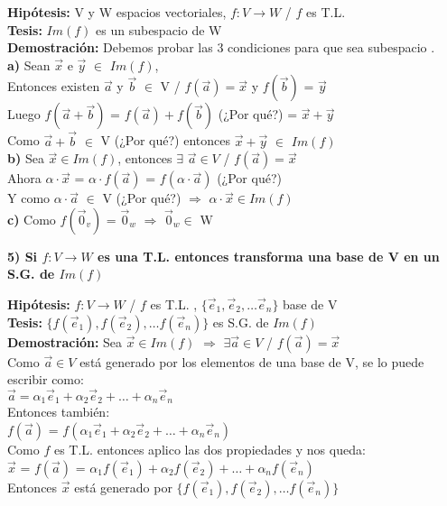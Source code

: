 \documentclass[11pt]{article}
\begin{document}
\vspace{2mm} \noindent
{\bfseries Hipótesis:} V y W espacios vectoriales, $f: V \rightarrow W$ / $f$ es T.L. \\
{\bfseries Tesis:} $Im(f)$ es un subespacio de W \\
{\bfseries Demostración:} Debemos probar las 3 condiciones para que sea
subespacio .\\
{\bfseries{a)}} Sean $\vec{x}$ e $\vec{y}$ $\in$ $Im(f)$, \\
Entonces existen $\vec{a}$ y $\vec{b}$ $\in$ V / $f(\vec{a}) = \vec{x}$ y $f(\vec{b})$ = $\vec{y}$ \\
Luego $f(\vec{a} + \vec{b})$ = $f(\vec{a}) + f(\vec{b})$ (¿Por qué?) = $\vec{x} + \vec{y}$\\
Como $\vec{a} + \vec{b}$ $\in$ V (¿Por qué?) entonces $\vec{x} + \vec{y}$ $\in $ $Im(f)$\\
{\bfseries{b)}} Sea $\vec{x} \in Im(f)$, entonces $\exists$ $\vec{a} \in V$ / $f(\vec{a}) = \vec{x}$ \\
Ahora $\alpha \cdot \vec{x}$ = $\alpha \cdot f(\vec{a})$ = $f(\alpha \cdot \vec{a})$ (¿Por qué?)\\
Y como $\alpha \cdot \vec{a}$ $\in$ V (¿Por qué?) $\Rightarrow$ $\alpha \cdot \vec{x} \in Im(f)$ \\
{\bfseries{c)}} Como $f(\vec{0}_v)$ = $\vec{0}_w$ $\Rightarrow$ $\vec{0}_w \in$ W

\vspace{2mm} \noindent
{\Large \bfseries{5) Si $f: V \rightarrow W$ es una T.L. entonces transforma una base de V en un S.G. de $Im(f)$}}

\vspace{2mm} \noindent
{\bfseries Hipótesis:} $f: V \rightarrow W$ / $f$ es T.L. , $\{\vec{e}_1, \vec{e}_2, \hdots  \vec{e}_n\}$ base de V \\
{\bfseries Tesis:} $\{f(\vec{e}_1), f(\vec{e}_2), \hdots  f(\vec{e}_n)\}$ es S.G. de $Im(f)$ \\
{\bfseries Demostración:} Sea $\vec{x} \in Im(f)$ $\Rightarrow$ $\exists \vec{a} \in V$ / $f(\vec{a}) = \vec{x}$ \\
Como $\vec{a} \in V$ está generado por los elementos de una base de V, se lo puede escribir como: \\
$\vec{a} = \alpha_1\vec{e}_1 + \alpha_2\vec{e}_2 + \hdots + \alpha_n\vec{e}_n$
\\Entonces también: \\
$f(\vec{a})$ = $f(\alpha_1\vec{e}_1 + \alpha_2\vec{e}_2 + \hdots + \alpha_n\vec{e}_n)$\\
Como $f$ es T.L. entonces aplico las dos propiedades y nos queda: \\
$\vec{x}$ = $f(\vec{a})$ = $\alpha_1f(\vec{e}_1) + \alpha_2f(\vec{e}_2) + \hdots + \alpha_nf(\vec{e}_n)$ \\
Entonces $\vec{x}$ está generado por $\{f(\vec{e}_1), f(\vec{e}_2), \hdots  f(\vec{e}_n)\}$
\end{document}
